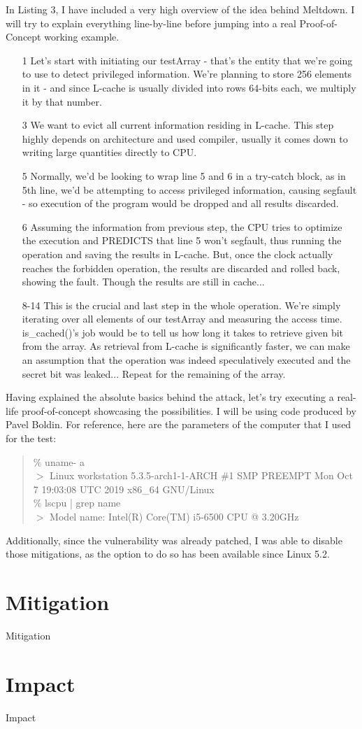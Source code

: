 \documentclass{article}
\begin{document}
In Listing 3, I have included a very high overview of the idea behind Meltdown. I will try to explain everything line-by-line before jumping into a real Proof-of-Concept working example.
\begin{enumerate}

  \item [1] Let's start with initiating our testArray - that's the entity that we're going to use to detect privileged information. We're planning to store 256 elements in it - and since L-cache is usually divided into rows 64-bits each, we multiply it by that number. 
  \item [3] We want to evict all current information residing in L-cache. This step highly depends on architecture and used compiler, usually it comes down to writing large quantities directly to CPU.
  \item [5] Normally, we'd be looking to wrap line 5 and 6 in a try-catch block, as in 5th line, we'd be attempting to access privileged information, causing segfault - so execution of the program would be dropped and all results discarded.
  \item [6] Assuming the information from previous step, the CPU tries to optimize the execution and PREDICTS that line 5 won't segfault, thus running the operation and saving the results in L-cache. But, once the clock actually reaches the forbidden operation, the results are discarded and rolled back, showing the fault. Though the results are still in cache...
  \item [8-14] This is the crucial and last step in the whole operation. We're simply iterating over all elements of our testArray and measuring the access time. is\_cached()'s job would be to tell us how long it takes to retrieve given bit from the array. As retrieval from L-cache is significantly faster, we can make an assumption that the operation was indeed speculatively executed and the secret bit was leaked... Repeat for the remaining of the array.

\end{enumerate}

Having explained the absolute basics behind the attack, let's try executing a real-life proof-of-concept showcasing the possibilities. I will be using code produced by Pavel Boldin. For reference, here are the parameters of the computer that I used for the test:

\begin{quote}
\% uname- a 
\\ $>$ Linux workstation 5.3.5-arch1-1-ARCH \#1 SMP PREEMPT Mon Oct 7 19:03:08 UTC 2019 x86\_64 GNU/Linux 
\\ \% lscpu | grep name
\\ $>$ Model name: Intel(R) Core(TM) i5-6500 CPU @ 3.20GHz
\end{quote}

Additionally, since the vulnerability was already patched, I was able to disable those mitigations, as the option to do so has been available since Linux 5.2. 

\section{Mitigation}
Mitigation

\section{Impact}
Impact



 
\end{document}
